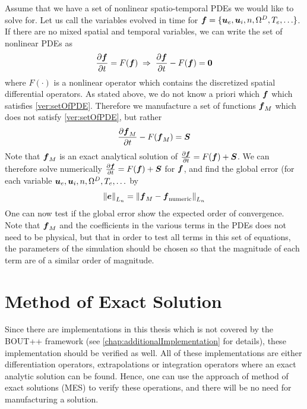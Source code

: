 Assume that we have a set of nonlinear spatio-temporal PDEs we would like to solve for.
Let us call the variables evolved in time for $\boldsymbol{f}=\{\boldsymbol{u}_e, \boldsymbol{u}_i, n, \Omega^D, T_e, \ldots\}$.
If there are no mixed spatial and temporal variables, we can write the set of nonlinear PDEs as
%
\begin{align}
  \frac{\partial {\boldsymbol{f}}}{\partial{t}} = F(\boldsymbol{f}) \; \Rightarrow \; \frac{\partial {\boldsymbol{f}}}{\partial{t}} - F(\boldsymbol{f}) = \boldsymbol{0}
  \label{ver:setOfPDE}
\end{align}
%
where $F(\cdot)$ is a nonlinear operator which contains the discretized spatial differential operators.
As stated above, we do not know a priori which $\boldsymbol{f}$ which satisfies \cref{ver:setOfPDE}.
Therefore we manufacture a set of functions $\boldsymbol{f}_M$ which does not satisfy \cref{ver:setOfPDE}, but rather
%
\begin{align*}
    \frac{\partial {\boldsymbol{f}_M}}{\partial{t}} - F(\boldsymbol{f}_M) = \boldsymbol{S}
\end{align*}
%
Note that $\boldsymbol{f}_M$ is an exact analytical solution of $\frac{\partial {\boldsymbol{f}}}{\partial{t}} = F(\boldsymbol{f}) + \boldsymbol{S}$.
We can therefore solve numerically $\frac{\partial {\boldsymbol{f}}}{\partial{t}} = F(\boldsymbol{f}) + \boldsymbol{S}$ for $\boldsymbol{f}$, and find the global error (for each variable $\boldsymbol{u}_e, \boldsymbol{u}_i, n, \Omega^D, T_e, \ldots$ by
%
\begin{align*}
    \left\|\boldsymbol{e}\right\|_{L_n} =
    \left\|\boldsymbol{f}_{M} - \boldsymbol{f}_{\text{numeric}}\right\|_{L_n}
\end{align*}
%
One can now test if the global error show the expected order of convergence.
Note that $\boldsymbol{f}_M$ and the coefficients in the various terms in the PDEs does not need to be physical, but that in order to test all terms in this set of equations, the parameters of the simulation should be chosen so that the magnitude of each term are of a similar order of magnitude.

\section{Method of Exact Solution}
\label{sec:MES}
%

Since there are implementations in this thesis which is not covered by the BOUT++ framework (see \cref{chap:additionalImplementation} for details), these implementation should be verified as well.
All of these implementations are either differentiation operators, extrapolations or integration operators where an exact analytic solution can be found.
Hence, one can use the approach of method of exact solutions (MES) to verify these operations, and there will be no need for manufacturing a solution.

